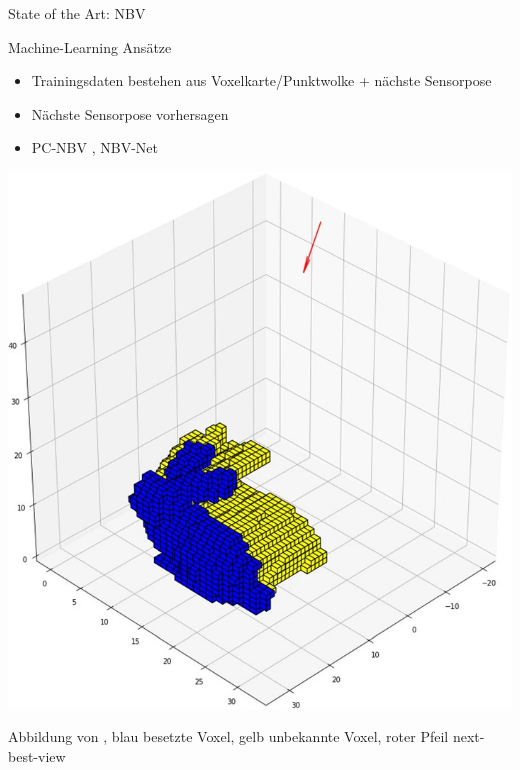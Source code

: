 \documentclass[aspectratio=169]{beamer}
\begin{document}
\begin{frame}{State of the Art: NBV}
	\begin{minipage}{0.55\textwidth}
		\begin{block}{Machine-Learning Ansätze}
			\begin{itemize}
				\item Trainingsdaten bestehen aus Voxelkarte/Punktwolke + nächste Sensorpose
				\item Nächste Sensorpose vorhersagen
				\item PC-NBV \cite{zeng_pc-nbv_2020}, NBV-Net \cite{mendoza_supervised_2020}
			\end{itemize}
		\end{block}
	\end{minipage}
	\hfill
	\begin{minipage}{0.4\textwidth}
		\includegraphics[width=1.0\textwidth]{Graphics/nbvnet.jpeg}
	\end{minipage}
	\centering
	Abbildung von \cite{vasquez-gomez_next-best-view_2021}, blau besetzte Voxel, gelb unbekannte Voxel, roter Pfeil next-best-view
\end{frame}
\end{document}
